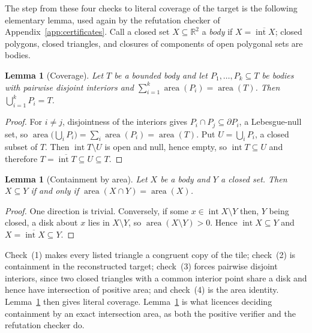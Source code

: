 \documentclass[11pt]{amsart}
\newtheorem{lemma}[theorem]{Lemma}
\theoremstyle{definition}
\theoremstyle{remark}
\begin{document}
The step from these four checks to literal coverage of the target is the
following elementary lemma, used again by the refutation checker of
Appendix~\ref{app:certificates}.  Call a closed set $X\subseteq\mathbb R^2$ a
\emph{body} if $X=\overline{\operatorname{int}X}$; closed polygons, closed
triangles, and closures of components of open polygonal sets are bodies.

\begin{lemma}[Coverage]\label{lem:coverage}
Let $T$ be a bounded body and let $P_1,\dots,P_k\subseteq T$ be bodies with
pairwise disjoint interiors and
$\sum_{i=1}^k\operatorname{area}(P_i)=\operatorname{area}(T)$.  Then
$\bigcup_{i=1}^kP_i=T$.
\end{lemma}

\begin{proof}
For $i\ne j$, disjointness of the interiors gives
$P_i\cap P_j\subseteq\partial P_i$, a Lebesgue-null set, so
$\operatorname{area}\big(\bigcup_iP_i\big)=\sum_i\operatorname{area}(P_i)
=\operatorname{area}(T)$.  Put $U=\bigcup_iP_i$, a closed subset of $T$.
Then $\operatorname{int}T\setminus U$ is open and null, hence empty, so
$\operatorname{int}T\subseteq U$ and therefore
$T=\overline{\operatorname{int}T}\subseteq U\subseteq T$.
\end{proof}

\begin{lemma}[Containment by area]\label{lem:area-containment}
Let $X$ be a body and $Y$ a closed set.  Then $X\subseteq Y$ if and only if
$\operatorname{area}(X\cap Y)=\operatorname{area}(X)$.
\end{lemma}

\begin{proof}
One direction is trivial.  Conversely, if some
$x\in\operatorname{int}X\setminus Y$ then, $Y$ being closed, a disk about $x$
lies in $X\setminus Y$, so $\operatorname{area}(X\setminus Y)>0$.  Hence
$\operatorname{int}X\subseteq Y$ and
$X=\overline{\operatorname{int}X}\subseteq Y$.
\end{proof}

Check~(1) makes every listed triangle a congruent copy of the tile;
check~(2) is containment in the reconstructed target; check~(3) forces
pairwise disjoint interiors, since two closed triangles with a common
interior point share a disk and hence have intersection of positive area; and
check~(4) is the area identity.  Lemma~\ref{lem:coverage} then gives literal
coverage.  Lemma~\ref{lem:area-containment} is what licences deciding
containment by an exact intersection area, as both the positive verifier and
the refutation checker do.
\end{document}
